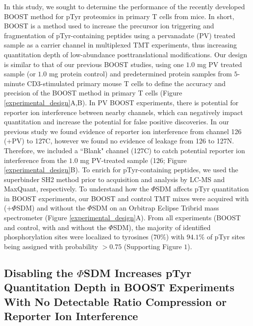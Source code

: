 \documentclass[journal=jprobs,manuscript=article]{achemso}
\begin{document}
In this study, we sought to determine the performance of the recently developed BOOST method for pTyr proteomics in primary T cells from mice. In short, BOOST is a method used to increase the precursor ion triggering and fragmentation of pTyr-containing peptides using a pervanadate (PV) treated sample as a carrier channel in multiplexed TMT experiments, thus increasing quantitation depth of low-abundance posttranslational modifications\cite{chua2020tandem}. Our design is similar to that of our previous BOOST studies\cite{chua2020tandem,chua2021ovalbumin}, using one $1.0$ mg PV treated sample (or $1.0$ mg protein control) and predetermined protein samples from $5$-minute CD3-stimulated primary mouse T cells to define the accuracy and precision of the BOOST method in primary T cells (Figure \ref{experimental_design}A,B). In PV BOOST experiments, there is potential for reporter ion interference between nearby channels, which can negatively impact quantitation and increase the potential for false positive discoveries\cite{stopfer2021quantitative}. In our previous study we found evidence of reporter ion interference from channel 126 (+PV) to 127C, however we found no evidence of leakage from 126 to 127N\cite{chua2021ovalbumin}. Therefore, we included a ``Blank" channel (127C) to catch potential reporter ion interference from the $1.0$ mg PV-treated sample (126; Figure \ref{experimental_design}B). To enrich for pTyr-containing peptides, we used the superbinder SH2 method\cite{yao2018sh2,yao2019one,chua2020tandem,griffith2021silac} prior to acquisition and analysis by LC-MS and MaxQuant, respectively. To understand how the $\Phi$SDM affects pTyr quantitation in BOOST experiments, our BOOST and control TMT mixes were acquired with ($+\Phi$SDM) and without the $\Phi$SDM on an Orbitrap Eclipse Tribrid mass spectrometer (Figure \ref{experimental_design}A). From all experiments (BOOST and control, with and without the $\Phi$SDM), the majority of identified phosphorylation sites were localized to tyrosines ($70\%$) with $94.1\%$  of pTyr sites being assigned with probability $>0.75$ (Supporting Figure $1$). 


\subsection{Disabling the $\Phi$SDM Increases pTyr Quantitation Depth in BOOST Experiments With No Detectable Ratio Compression or Reporter Ion Interference}
\end{document}
